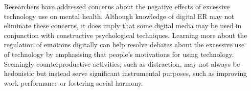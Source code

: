 \documentclass[lettersize,journal]{IEEEtran}
\begin{document}
Researchers have addressed concerns about the negative effects of excessive technology use on mental health. Although knowledge of digital ER may not eliminate these concerns, it does imply that some digital media may be used in conjunction with constructive psychological techniques. Learning more about the regulation of emotions digitally can help resolve debates about the excessive use of technology by emphasising that people's motivations for using technology. Seemingly counterproductive activities, such as distraction, may not always be hedonistic but instead serve significant instrumental purposes, such as improving work performance or fostering social harmony.











 
\end{document}

